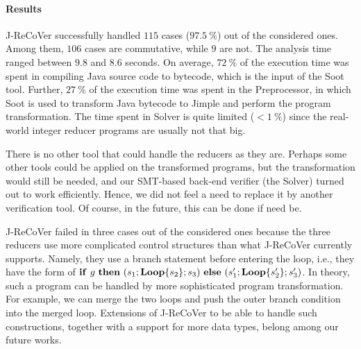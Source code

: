 \documentclass{llncs}
\newcommand{\ite}[3]{
	 \ifmmode
	 \mathbf{if}\ #1 \ \mathbf{then}\ #2\  \mathbf{else}\ #3
	 \else
	 \textbf{if}\ #1 \ \textbf{then}\ #2\  \textbf{else}\ #3
	 \fi}
\newcommand{\rloop}{
	\ifmmode
	\mathbf{Loop}
	\else
	\textbf{Loop}
	\fi}
\begin{document}
\vspace{-1mm}
\paragraph*{Results} 

J-ReCoVer successfully handled $115$ cases ($97.5~\%$) out of the considered
ones. Among them, $106$ cases are commutative, while $9$ are not. The analysis time ranged between $9.8$ and $8.6$ seconds. On average,
$72~\%$ of the execution time was spent in compiling Java source code to
bytecode, which is the input of the Soot tool. Further, $27~\%$ of the execution
time was spent in the Preprocessor, in which Soot is used to transform Java
bytecode to Jimple and perform the program transformation. The time spent in
Solver is quite limited ($<1~\%$) since the real-world integer reducer programs
are usually not that big. 

There is no other tool that could handle the reducers as they are. Perhaps some
other tools could be applied on the transformed programs, but the
transformation would still be needed, and our SMT-based back-end verifier (the
Solver) turned out to work efficiently. Hence, we did not feel a need to replace
it by another verification tool. Of course, in the future, this can be done if
need be.

J-ReCoVer failed in three cases out of the considered ones because the three
reducers use more complicated control structures than what J-ReCoVer currently
supports. Namely, they use a branch statement before entering the loop, i.e.,
they have the form of
$\ite{g}{(s_1;\rloop\{s_2\};s_3)}{(s'_1;\rloop\{s'_2\};s'_3)}$. In theory, such
a program can be handled by more sophisticated program transformation. For
example, we can merge the two loops and push the outer branch condition into the
merged loop. Extensions of J-ReCoVer to be able to handle such constructions,
together with a support for more data types, belong among our future works.

\end{document}
